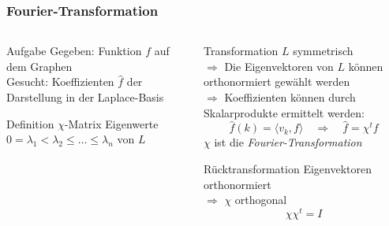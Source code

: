 %
%
%
\bgroup
\begin{frame}[t]
\setlength{\abovedisplayskip}{5pt}
\setlength{\belowdisplayskip}{5pt}
\frametitle{Fourier-Transformation}
\vspace{-20pt}
\begin{columns}[t,onlytextwidth]
\begin{column}{0.48\textwidth}
\begin{block}{Aufgabe}
Gegeben: Funktion $f$ auf dem Graphen
\\
Gesucht: Koeffizienten $\hat{f}$ der Darstellung in der Laplace-Basis
\end{block}
\begin{block}{Definition $\chi$-Matrix}
Eigenwerte $0=\lambda_1<\lambda_2\le \dots \le \lambda_n$ von $L$
\vspace{-10pt}
\begin{center}
\end{center}
\end{block}
\end{column}
\begin{column}{0.48\textwidth}
\begin{block}{Transformation}
$L$ symmetrisch
\\
$\Rightarrow$ 
Die Eigenvektoren von $L$ können orthonormiert gewählt werden
\\
$\Rightarrow$ 
Koeffizienten können durch Skalarprodukte ermittelt werden:
\[
\hat{f}(k)
=
\langle v_k, f\rangle
\quad\Rightarrow\quad
\hat{f}
=
\chi^tf
\]
$\chi$ ist die {\em Fourier-Transformation}
\end{block}
\begin{block}{Rücktransformation}
Eigenvektoren orthonormiert
\\
$\Rightarrow$
$\chi$ orthogonal
\[
\chi\chi^t = I
\]
\end{block}
\end{column}
\end{columns}
\end{frame}
\egroup
